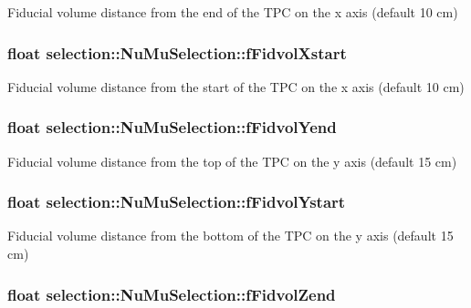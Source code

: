 Fiducial volume distance from the end of the T\-P\-C on the x axis (default 10 cm) \hypertarget{classselection_1_1NuMuSelection_a5f015a245b7a149756f787f2dab9fcc7}{
\subsubsection[{f\-Fidvol\-Xstart}]{\setlength{\rightskip}{0pt plus 5cm}float selection\-::\-Nu\-Mu\-Selection\-::f\-Fidvol\-Xstart\hspace{0.3cm}{\ttfamily [private]}}}\label{classselection_1_1NuMuSelection_a5f015a245b7a149756f787f2dab9fcc7}
Fiducial volume distance from the start of the T\-P\-C on the x axis (default 10 cm) \hypertarget{classselection_1_1NuMuSelection_ac07847d191d7d4db8267d89e0caab414}{
\subsubsection[{f\-Fidvol\-Yend}]{\setlength{\rightskip}{0pt plus 5cm}float selection\-::\-Nu\-Mu\-Selection\-::f\-Fidvol\-Yend\hspace{0.3cm}{\ttfamily [private]}}}\label{classselection_1_1NuMuSelection_ac07847d191d7d4db8267d89e0caab414}
Fiducial volume distance from the top of the T\-P\-C on the y axis (default 15 cm) \hypertarget{classselection_1_1NuMuSelection_a68277003f5211d751a5965dc990ff661}{
\subsubsection[{f\-Fidvol\-Ystart}]{\setlength{\rightskip}{0pt plus 5cm}float selection\-::\-Nu\-Mu\-Selection\-::f\-Fidvol\-Ystart\hspace{0.3cm}{\ttfamily [private]}}}\label{classselection_1_1NuMuSelection_a68277003f5211d751a5965dc990ff661}
Fiducial volume distance from the bottom of the T\-P\-C on the y axis (default 15 cm) \hypertarget{classselection_1_1NuMuSelection_adae665ca6cf1ece4b7e00b345cebbfe3}{
\subsubsection[{f\-Fidvol\-Zend}]{\setlength{\rightskip}{0pt plus 5cm}float selection\-::\-Nu\-Mu\-Selection\-::f\-Fidvol\-Zend\hspace{0.3cm}{\ttfamily [private]}}}\label{classselection_1_1NuMuSelection_adae665ca6cf1ece4b7e00b345cebbfe3}
